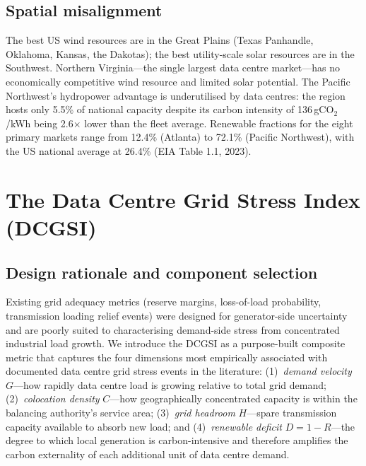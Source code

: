 \documentclass[preprint,12pt]{elsarticle}
\begin{document}
\subsection{Spatial misalignment}
\label{subsec:spatial_mismatch}

The best US wind resources are in the Great Plains (Texas Panhandle,
Oklahoma, Kansas, the Dakotas); the best utility-scale solar resources
are in the Southwest. Northern Virginia---the single largest data centre
market---has no economically competitive wind resource and limited
solar potential. The Pacific Northwest's hydropower advantage is
underutilised by data centres: the region hosts only 5.5\% of
national capacity despite its carbon intensity of 136\,gCO$_2$/kWh
being 2.6$\times$ lower than the fleet average. Renewable fractions
for the eight primary markets range from 12.4\% (Atlanta) to 72.1\%
(Pacific Northwest), with the US national average at 26.4\%
(EIA Table 1.1, 2023).

\section{The Data Centre Grid Stress Index (DCGSI)}
\label{sec:dcgsi}

\subsection{Design rationale and component selection}
\label{subsec:dcgsi_design}

Existing grid adequacy metrics (reserve margins, loss-of-load probability,
transmission loading relief events) were designed for generator-side
uncertainty and are poorly suited to characterising demand-side stress from
concentrated industrial load growth. We introduce the DCGSI as a
purpose-built composite metric that captures the four dimensions most
empirically associated with documented data centre grid stress events in
the literature: (1)~\textit{demand velocity} $G$---how rapidly data centre
load is growing relative to total grid demand; (2)~\textit{colocation
density} $C$---how geographically concentrated capacity is within the
balancing authority's service area; (3)~\textit{grid headroom} $H$---spare
transmission capacity available to absorb new load; and (4)~\textit{renewable
deficit} $D = 1 - R$---the degree to which local generation is
carbon-intensive and therefore amplifies the carbon externality of each
additional unit of data centre demand.
\end{document}
